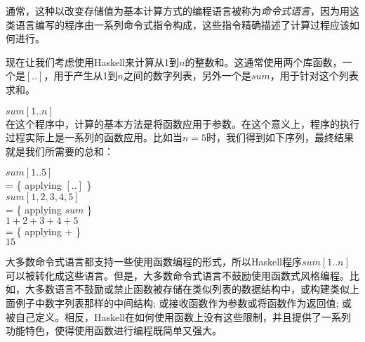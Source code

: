 通常，这种以改变存储值为基本计算方式的编程语言被称为\textit{命令式语言}，因为用这类语言编写的程序由一系列命令式指令构成，这些指令精确描述了计算过程应该如何进行。

现在让我们考虑使用Haskell来计算从1到$n$的整数和。这通常使用两个库函数，一个是$[..]$，用于产生从1到$n$之间的数字列表，另外一个是$sum$，用于针对这个列表求和。 

\noindent\hspace*{1cm} $sum [1..n]$\\

在这个程序中，计算的基本方法是将函数应用于参数。在这个意义上，程序的执行过程实际上是一系列的函数应用。比如当$n
= 5$时，我们得到如下序列，最终结果就是我们所需要的总和：

\noindent\hspace*{1cm} $sum [1..5]$\\
\hspace*{1cm} = \{ applying $[..]$ \}\\
\hspace*{1cm} $sum [1, 2, 3, 4, 5]$\\
\hspace*{1cm} = \{ applying $sum$ \}\\
\hspace*{1cm} $1+2+3+4+5$\\
\hspace*{1cm} = \{ applying + \}\\
\hspace*{1cm} $15$

大多数命令式语言都支持一些使用函数编程的形式，所以Haskell程序$sum [1..n]$可以被转化成这些语言。但是，大多数命令式语言不鼓励使用函数式风格编程。比如，大多数语言不鼓励或禁止函数被存储在类似列表的数据结构中，或构建类似上面例子中数字列表那样的中间结构; 或接收函数作为参数或将函数作为返回值; 或被自己定义。相反，Haskell在如何使用函数上没有这些限制，并且提供了一系列功能特色，使得使用函数进行编程既简单又强大。

